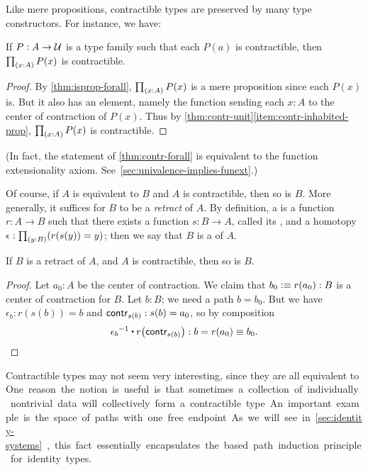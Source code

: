 Like mere propositions, contractible types are preserved by many type constructors.
For instance, we have:

\begin{lem}\label{thm:contr-forall}
  If $P:A\to\mathcal{U}$ is a type family such that each $P(a)$ is contractible, then $\prd{x:A} P(x)$ is contractible.
\end{lem}
\begin{proof}
  By \autoref{thm:isprop-forall}, $\prd{x:A} P(x)$ is a mere proposition since each $P(x)$ is.
  But it also has an element, namely the function sending each $x:A$ to the center of contraction of $P(x)$.
  Thus by \autoref{thm:contr-unit}\ref{item:contr-inhabited-prop}, $\prd{x:A} P(x)$ is contractible.
\end{proof}

%
(In fact, the statement of \autoref{thm:contr-forall} is equivalent to the function extensionality axiom.
See~\autoref{sec:univalence-implies-funext}.)

Of course, if $A$ is equivalent to $B$ and $A$ is contractible, then so is $B$.
More generally, it suffices for $B$ to be a \emph{retract} of $A$.
By definition, a 
%
%
is a function $r : A \to B$ such that there exists a function $s : B \to A$, called its ,
%
%
and a homotopy $\epsilon:\prd{y:B} (r(s(y))=y)$; then we say that $B$ is a %
of $A$.

\begin{lem}\label{thm:retract-contr}
  If $B$ is a retract of $A$, and $A$ is contractible, then so is $B$.
\end{lem}
\begin{proof}
  Let $a_0 : A$ be the center of contraction.
  We claim that $b_0 \vcentcolon\equiv r(a_0) : B$ is a center of contraction for $B$.
  Let $b : B$; we need a path $b = b_0$.
  But we have $\epsilon_b : r(s(b)) = b$ and $\mathsf{contr}_{s(b)} : s(b) = a_0$, so by composition
  \[ \opp{\epsilon_b} \ct \ap{r}{\contr_{s(b)}} : b = r(a_0) \jdeq b_0. \qedhere\]
\end{proof}

Contractible types may not seem very interesting, since they are all equivalent to \unit.
One reason the notion is useful is that sometimes a collection of individually nontrivial data will collectively form a contractible type.
An important example is the space of paths with one free endpoint.
As we will see in \autoref{sec:identity-systems}, this fact essentially
encapsulates the based path induction principle for identity types.


